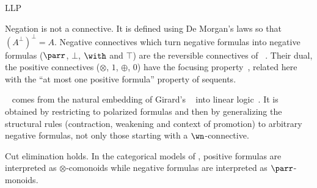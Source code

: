 \begin{entry}{LLP}
\begin{clarifications}
Negation is not a connective. It is defined using De Morgan's laws so that $(A^\bot)^\bot=A$.
Negative connectives which turn negative formulas into negative formulas ($\parr$, $\bot$, $\with$ and $\top$) are the reversible connectives of \LL~.
Their dual, the positive connectives ($\otimes$, $1$, $\oplus$, $0$) have the focusing property~\cite{focal}, related here with the ``at most one positive formula'' property of sequents.
\end{clarifications}

\begin{history}
\LLP~\cite{phdlaurent} comes from the natural embedding of Girard's \LC~ into linear logic~. It is obtained by restricting \LL{} to polarized formulas and then by generalizing the structural rules (contraction, weakening and context of promotion) to arbitrary negative formulas, not only those starting with a $\wn$-connective.
\end{history}

\begin{technicalities}
Cut elimination holds.
In the categorical models of \LLP, positive formulas are interpreted as $\otimes$-comonoids while negative formulas are interpreted as $\parr$-monoids.
\end{technicalities}













\end{entry}



